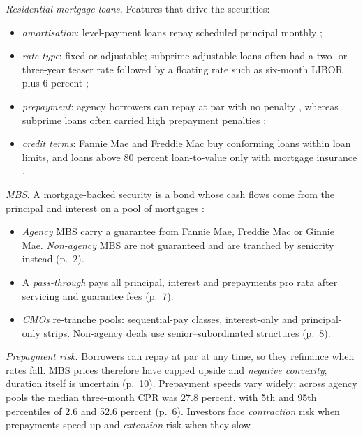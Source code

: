 \begin{qfmethod}\label{meth:mortgage-securities-prepayment}
 \emph{Residential mortgage loans.} Features that drive the securities:
\begin{itemize}
\item \emph{amortisation}: level-payment loans repay scheduled principal monthly \citep[pp.~34--35]{fabozzi-kothari-securitisation-2008};
\item \emph{rate type}: fixed or adjustable; subprime adjustable loans often had a two- or three-year teaser rate followed by a floating rate such as six-month LIBOR plus 6 percent \citep[p.~206]{s7-hulloptions};
\item \emph{prepayment}: agency borrowers can repay at par with no penalty \citep[p.~10]{wide-fuster-mbs-review}, whereas subprime loans often carried high prepayment penalties \citep[p.~206 n.~3]{s7-hulloptions};
\item \emph{credit terms}: Fannie Mae and Freddie Mac buy conforming loans within loan limits, and loans above 80 percent loan-to-value only with mortgage insurance \citep[p.~2 n.~2]{wide-fuster-mbs-review}.
\end{itemize}

\emph{MBS.} A mortgage-backed security is a bond whose cash flows come from the principal and interest on a pool of mortgages \citep[pp.~1--2]{wide-fuster-mbs-review}:
\begin{itemize}
\item \emph{Agency} MBS carry a guarantee from Fannie Mae, Freddie Mac or Ginnie Mae. \emph{Non-agency} MBS are not guaranteed and are tranched by seniority instead (p.~2).
\item A \emph{pass-through} pays all principal, interest and prepayments pro rata after servicing and guarantee fees (p.~7).
\item \emph{CMOs} re-tranche pools: sequential-pay classes, interest-only and principal-only strips. Non-agency deals use senior--subordinated structures (p.~8).
\end{itemize}

\emph{Prepayment risk.} Borrowers can repay at par at any time, so they refinance when rates fall. MBS prices therefore have capped upside and \emph{negative convexity}; duration itself is uncertain (p.~10). Prepayment speeds vary widely: across agency pools the median three-month CPR was 27.8 percent, with 5th and 95th percentiles of 2.6 and 52.6 percent (p.~6). Investors face \emph{contraction} risk when prepayments speed up and \emph{extension} risk when they slow \citep[p.~43]{fabozzi-kothari-securitisation-2008}.


\end{qfmethod}
